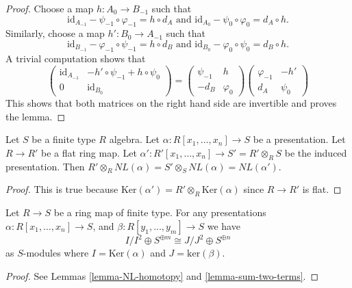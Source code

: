 \begin{proof}
Choose a map $h : A_0 \to B_{-1}$ such that
$$
\text{id}_{A_{-1}} - \psi_{-1} \circ \varphi_{-1} = h \circ d_A
\text{ and }
\text{id}_{A_0} - \psi_0 \circ \varphi_0 = d_A \circ h.
$$
Similarly, choose a map $h' : B_0 \to A_{-1}$ such that
$$
\text{id}_{B_{-1}} - \varphi_{-1} \circ \psi_{-1} = h \circ d_B
\text{ and }
\text{id}_{B_0} - \varphi_0 \circ \psi_0 = d_B \circ h.
$$
A trivial computation shows that
$$
\left(
\begin{matrix}
\text{id}_{A_{-1}} & -h' \circ \psi_{-1} + h \circ \psi_0 \\
0 & \text{id}_{B_0}
\end{matrix}
\right)
=
\left(
\begin{matrix}
\psi_{-1} & h \\
-d_B & \varphi_0
\end{matrix}
\right)
\left(
\begin{matrix}
\varphi_{-1} & - h' \\
d_A & \psi_0
\end{matrix}
\right)
$$
This shows that both matrices on the right hand side
are invertible and proves the lemma.
\end{proof}

\begin{lemma}
\label{lemma-change-base-NL}
Let $S$ be a finite type $R$ algebra.
Let $\alpha : R[x_1, \ldots, x_n] \to S$ be a presentation.
Let $R \to R'$ be a flat ring map.
Let $\alpha' : R'[x_1, \ldots, x_n] \to S' = R'\otimes_R S$
be the induced presentation.
Then $R' \otimes_R NL(\alpha) = S'\otimes_S NL(\alpha) = NL(\alpha')$.
\end{lemma}

\begin{proof}
This is true because
$\text{Ker}(\alpha') = R' \otimes_R \text{Ker}(\alpha)$
since $R \to R'$ is flat.
\end{proof}


\begin{lemma}
\label{lemma-conormal-module}
Let $R \to S$ be a ring map of finite type.
For any presentations $\alpha : R[x_1, \ldots, x_n] \to S$, and
$\beta : R[y_1, \ldots, y_m] \to S$ we have
$$
I/I^2 \oplus S^{\oplus m} \cong J/J^2 \oplus S^{\oplus n}
$$
as $S$-modules where $I = \text{Ker}(\alpha)$ and $J = \text{ker}(\beta)$.
\end{lemma}

\begin{proof}
See Lemmas \ref{lemma-NL-homotopy} and \ref{lemma-sum-two-terms}.
\end{proof}

